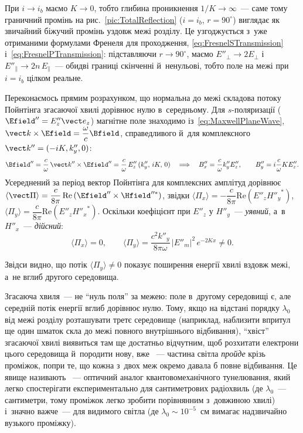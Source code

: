 При $i\to i_b$ маємо $K\to0$, тобто глибина проникнення $1/K\to\infty$~--- саме тому граничний промінь на рис.~\ref{pic:TotalReflection}
($i=i_b$, $r=90^\circ$) виглядає як звичайний біжучий промінь уздовж межі розділу. Це узгоджується з~уже отриманими формулами Френеля
для проходження, \eqref{eq:FresnelSTransmission} і~\eqref{eq:FresnelPTransmission}: підставляючи $r\to90^\circ$, маємо $E''_\perp\to
	2E_\perp$ і~$E''_\parallel\to2n\,E_\parallel$~--- обидві границі скінченні й~ненульові, тобто поле на межі при $i=i_b$ цілком реальне.

Переконаємось прямим розрахунком, що нормальна до межі складова потоку Пойнтінга згасаючої хвилі дорівнює нулю в~середньому. Для
$s$-поляризації ($\Efield''=E''_z\vect e_z$) магнітне поле знаходимо із~\eqref{eq:MaxwellPlaneWave}, $\vect k\times\Efield=\dfrac\omega
	c\Bfield$, справедливого й~для комплексного $\vect k''=(-iK,k''_y,0)$:
\begin{equation*}
	\Bfield'' = \frac{c}{\omega}\,\vect k''\times\Efield'' = \frac{c}{\omega}\,E''_z\,(k''_y,\,iK,\,0)
	\quad\Longrightarrow\quad
	B''_x = \frac{c}{\omega}k''_y E''_z, \qquad B''_y = i\frac{c}{\omega}K E''_z.
\end{equation*}
Усереднений за період вектор Пойнтінга для комплексних амплітуд дорівнює $\langle\vect\Pi\rangle=\dfrac{c}{8\pi}\,\mathrm{Re}\,(\Efield''\times\Hfield''^{*})$, звідки $\langle\Pi_x\rangle=-\dfrac{c}{8\pi}\mathrm{Re}(E''_z{H''_y}^{\!*})$, $\langle\Pi_y\rangle=\dfrac{c}{8\pi}\mathrm{Re}(E''_z{H''_x}^{\!*})$. Оскільки коефіцієнт при $E''_z$ у
$H''_y$~--- \emph{уявний}, а~в~$H''_x$~--- \emph{дійсний}:
\begin{equation}\label{eq:NormalFluxZero}
	\langle\Pi_x\rangle = 0, \qquad
	\langle\Pi_y\rangle = \frac{c^2k''_y}{8\pi\omega}\,|E''_m|^2\,e^{-2Kx} \neq 0.
\end{equation}

Звідси видно, що потік $\langle\Pi_y\rangle\ne0$ показує поширення енергії хвилі вздовж межі, а~не вглиб другого середовища.

\begin{Attention}
	Згасаюча хвиля~--- не \enquote{нуль поля} за межею: поле в~другому середовищі є, але середній потік енергії вглиб дорівнює нулю. Тому, якщо на відстані порядку $\lambda_0$ від межі розділу розташувати третє середовище (наприклад, наблизити впритул ще один шматок скла до межі повного внутрішнього відбивання), \enquote{хвіст} згасаючої хвилі виявиться там ще достатньо відчутним, щоб розхитати електрони цього середовища й~породити нову, вже ~--- частина світла \emph{пройде} крізь проміжок, попри те, що кожна з~двох меж окремо давала б повне відбивання. Це явище називають ~--- оптичний аналог квантовомеханічного тунелювання, який легко спостерігати експериментально для сантиметрових радіохвиль (де $\lambda_0$~--- сантиметри, тому проміжок легко зробити порівнянним з~довжиною хвилі) і~значно важче~--- для видимого світла (де $\lambda_0\sim10^{-5}$~см вимагає надзвичайно вузького проміжку).
\end{Attention}

